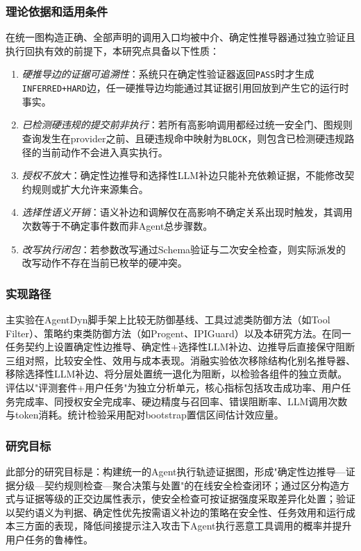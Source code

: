 \subsubsection{理论依据和适用条件}

在统一图构造正确、全部声明的调用入口均被中介、确定性推导器通过独立验证且执行回执有效的前提下，本研究点具备以下性质：
\begin{enumerate}
  \item \emph{硬推导边的证据可追溯性}：系统只在确定性验证器返回\texttt{PASS}时才生成\texttt{INFERRED+HARD}边，任一硬推导边均能通过其证据引用回放到产生它的运行时事实。
  \item \emph{已检测硬违规的提交前非执行}：若所有高影响调用都经过统一安全门、图规则查询发生在provider之前、且硬违规命中映射为\texttt{BLOCK}，则包含已检测硬违规路径的当前动作不会进入真实执行。
  \item \emph{授权不放大}：确定性边推导和选择性LLM补边只能补充依赖证据，不能修改契约规则或扩大允许来源集合。
  \item \emph{选择性语义开销}：语义补边和调解仅在高影响不确定关系出现时触发，其调用次数等于不确定事件数而非Agent总步骤数。
  \item \emph{改写执行闭包}：若参数改写通过Schema验证与二次安全检查，则实际派发的改写动作不存在当前已枚举的硬冲突。
\end{enumerate}

\subsubsection{实现路径}

主实验在AgentDyn脚手架上比较无防御基线、工具过滤类防御方法（如Tool Filter）、策略约束类防御方法（如Progent、IPIGuard）以及本研究方法。在同一任务契约上设置确定性边推导、确定性+选择性LLM补边、边推导后直接保守阻断三组对照，比较安全性、效用与成本表现。消融实验依次移除结构化别名推导器、移除选择性LLM补边、将分层处置统一退化为阻断，以检验各组件的独立贡献。评估以"评测套件+用户任务"为独立分析单元，核心指标包括攻击成功率、用户任务完成率、同授权安全完成率、硬边精度与召回率、错误阻断率、LLM调用次数与token消耗。统计检验采用配对bootstrap置信区间估计效应量。

\subsubsection{研究目标}
此部分的研究目标是：构建统一的Agent执行轨迹证据图，形成"确定性边推导—证据分级—契约规则检查—聚合决策与处置"的在线安全检查闭环；通过区分构造方式与证据等级的正交边属性表示，使安全检查可按证据强度采取差异化处置；验证以契约语义为判据、确定性优先按需语义补边的策略在安全性、任务效用和运行成本三方面的表现，降低间接提示注入攻击下Agent执行恶意工具调用的概率并提升用户任务的鲁棒性。


